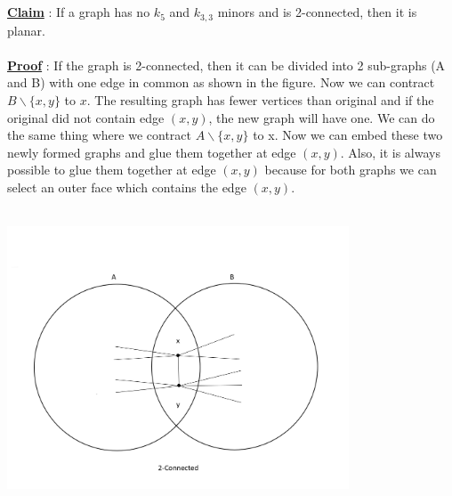 \documentclass{article}
\begin{document}
    \\\\
    \underline{\textbf{Claim}} : If a graph has no $k_{5}$ and $k_{3,3}$ minors and is 2-connected, then it is planar. 
    \\\\
    \underline{\textbf{Proof}} : If the graph is 2-connected, then it can be divided into 2 sub-graphs (A and B) with one edge in common as shown in the figure. Now we can contract $B \backslash \{x,y\}$ to $x$. The resulting graph has fewer vertices than original and if the original did not contain edge $(x,y)$, the new graph will have one. We can do the same thing where we contract $A \backslash \{x,y\}$ to x. Now we can embed these two newly formed graphs and glue them together at edge $(x,y)$. Also, it is always possible to glue them together at edge $(x,y)$ because for both graphs we can select an outer face which contains the edge $(x,y)$.
    \\\\
    \centerline{\includegraphics[width=4in]{Images/2conngraph.PNG}}
    \newpage
\end{document}
